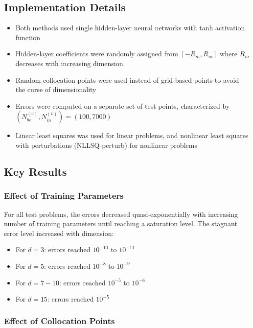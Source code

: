\documentclass[11pt]{article}
\begin{document}
\subsection{Implementation Details}

\begin{itemize}
    \item Both methods used single hidden-layer neural networks with tanh activation function
    \item Hidden-layer coefficients were randomly assigned from $[-R_m, R_m]$ where $R_m$ decreases with increasing dimension
    \item Random collocation points were used instead of grid-based points to avoid the curse of dimensionality
    \item Errors were computed on a separate set of test points, characterized by $(N_{bc}^{(v)}, N_{in}^{(v)}) = (100, 7000)$
    \item Linear least squares was used for linear problems, and nonlinear least squares with perturbations (NLLSQ-perturb) for nonlinear problems
\end{itemize}

\subsection{Key Results}

\subsubsection{Effect of Training Parameters}

For all test problems, the errors decreased quasi-exponentially with increasing number of training parameters until reaching a saturation level. The stagnant error level increased with dimension:
\begin{itemize}
    \item For $d=3$: errors reached $10^{-10}$ to $10^{-11}$
    \item For $d=5$: errors reached $10^{-8}$ to $10^{-9}$
    \item For $d=7-10$: errors reached $10^{-5}$ to $10^{-6}$
    \item For $d=15$: errors reached $10^{-5}$
\end{itemize}

\subsubsection{Effect of Collocation Points}
\end{document}

